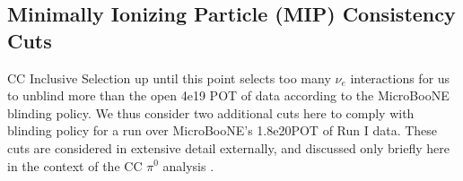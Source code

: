 %
%
%


\clearpage
\subsection{ Minimally Ionizing Particle (MIP) Consistency Cuts}

CC Inclusive Selection up until this point selects too many $\nu_e$ interactions for us to unblind more than the open 4e19 POT of data according to the MicroBooNE blinding policy. We thus consider two additional cuts here to comply with blinding policy for a run over MicroBooNE's 1.8e20POT of Run I data.  These cuts are considered in extensive detail externally, and discussed only briefly here in the context of the CC $\pi^0$ analysis \cite{bib:jz_unblinding_note}. 


